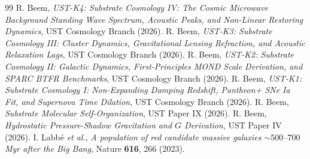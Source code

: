\documentclass[11pt,a4paper]{article}
\begin{document}
	\begin{thebibliography}{99}
		 R. Beem, \textit{UST-K4: Substrate Cosmology IV: The Cosmic Microwave Background Standing Wave Spectrum, Acoustic Peaks, and Non-Linear Restoring Dynamics}, UST Cosmology Branch (2026).
		 R. Beem, \textit{UST-K3: Substrate Cosmology III: Cluster Dynamics, Gravitational Lensing Refraction, and Acoustic Relaxation Lags}, UST Cosmology Branch (2026).
		 R. Beem, \textit{UST-K2: Substrate Cosmology II: Galactic Dynamics, First-Principles MOND Scale Derivation, and SPARC BTFR Benchmarks}, UST Cosmology Branch (2026).
		 R. Beem, \textit{UST-K1: Substrate Cosmology I: Non-Expanding Damping Redshift, Pantheon+ SNe Ia Fit, and Supernova Time Dilation}, UST Cosmology Branch (2026).
		 R. Beem, \textit{Substrate Molecular Self-Organization}, UST Paper IX (2026).
		 R. Beem, \textit{Hydrostatic Pressure-Shadow Gravitation and $G$ Derivation}, UST Paper IV (2026).
		 I. Labb\'e \textit{et al.}, \textit{A population of red candidate massive galaxies $\sim 500$--$700$ Myr after the Big Bang}, Nature \textbf{616}, 266 (2023).
	\end{thebibliography}
	
\end{document}
